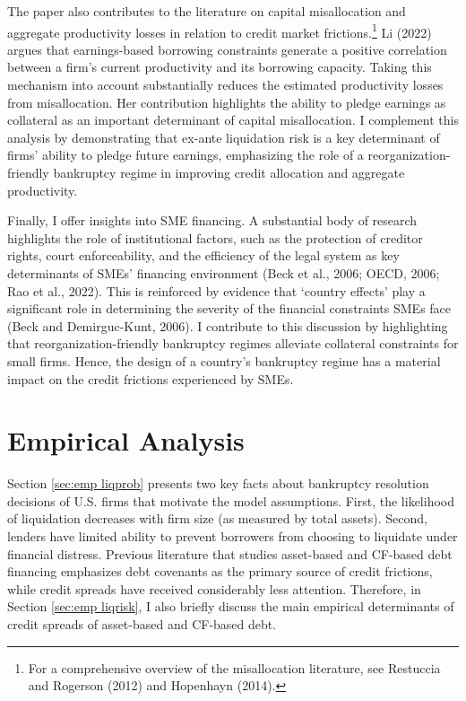\documentclass[12pt]{article}
\begin{document}
The paper also contributes to the literature on capital misallocation and aggregate productivity losses in relation to credit market frictions.\footnote{For a comprehensive overview of the misallocation literature, see Restuccia and Rogerson (2012) and Hopenhayn (2014).} Li (2022) argues that earnings-based borrowing constraints generate a positive correlation between a firm's current productivity and its borrowing capacity. Taking this mechanism into account substantially reduces the estimated productivity losses from misallocation. Her contribution highlights the ability to pledge earnings as collateral as an important determinant of capital misallocation. I complement this analysis by demonstrating that ex-ante liquidation risk is a key determinant of firms' ability to pledge future earnings, emphasizing the role of a reorganization-friendly bankruptcy regime in improving credit allocation and aggregate productivity. 

Finally, I offer insights into SME financing. A substantial body of research highlights the role of institutional factors, such as the protection of creditor rights, court enforceability, and the efficiency of the legal system as key determinants of SMEs' financing environment (Beck et al., 2006; OECD, 2006; Rao et al., 2022). This is reinforced by evidence that `country effects' play a significant role in determining the severity of the financial constraints SMEs face (Beck and Demirguc-Kunt, 2006). I contribute to this discussion by highlighting that reorganization-friendly bankruptcy regimes alleviate collateral constraints for small firms. Hence, the design of a country's bankruptcy regime has a material impact on the credit frictions experienced by SMEs.

\section{Empirical Analysis \label{sec:empirical analysis}}
Section \ref{sec:emp liqprob} presents two key facts about bankruptcy resolution decisions of U.S. firms that motivate the model assumptions. First, the likelihood of liquidation decreases with firm size (as measured by total assets). Second, lenders have limited ability to prevent borrowers from choosing to liquidate under financial distress. Previous literature that studies asset-based and CF-based debt financing emphasizes debt covenants as the primary source of credit frictions, while credit spreads have received considerably less attention. Therefore, in Section \ref{sec:emp liqrisk}, I also briefly discuss the main empirical determinants of credit spreads of asset-based and CF-based debt. 
\end{document}
